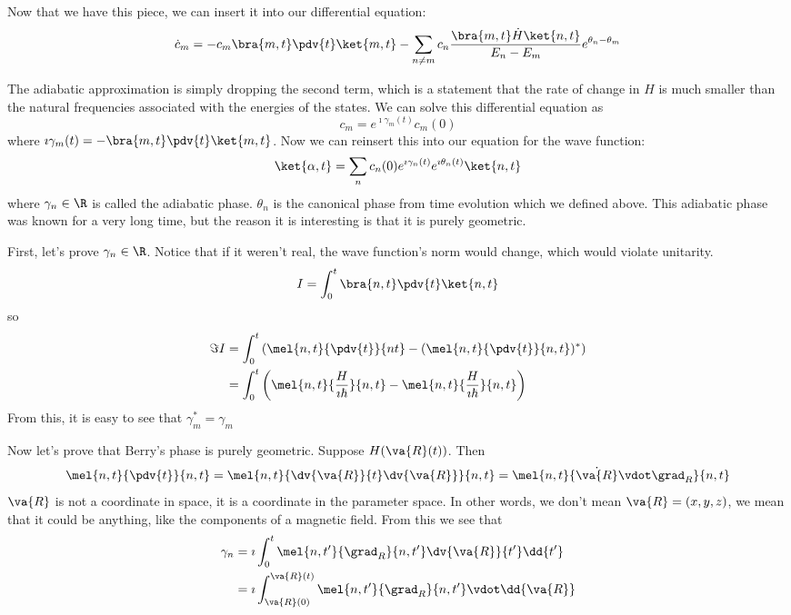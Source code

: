 \documentclass[a4paper,twoside,master.tex]{subfiles}
\begin{document}
Now that we have this piece, we can insert it into our differential equation:
\begin{equation}
    \dot{c}_m = -c_m \bra{m,t} \pdv{t}\ket{m,t} - \sum_{n \neq m} c_n \frac{\bra{m,t} \dot{H}\ket{n,t}}{E_n - E_m} e^{\theta_n - \theta_m} 
\end{equation}

The adiabatic approximation is simply dropping the second term, which is a statement that the rate of change in $ H $ is much smaller than the natural frequencies associated with the energies of the states. We can solve this differential equation as
\begin{equation}
    c_m = e^{\imath \gamma_m(t)} c_m(0)
\end{equation}
where $ \imath \gamma_m(t) = -\bra{m, t} \pdv{t}\ket{m, t} $. Now we can reinsert this into our equation for the wave function:
\begin{equation}
    \ket{\alpha, t} = \sum_n c_n(0) e^{\imath \gamma_n(t)} e^{\imath \theta_n(t)}\ket{n, t}
\end{equation}
where $ \gamma_n \in \R $ is called the adiabatic phase. $ \theta_n $ is the canonical phase from time evolution which we defined above. This adiabatic phase was known for a very long time, but the reason it is interesting is that it is purely geometric.

First, let's prove $ \gamma_n \in \R $. Notice that if it weren't real, the wave function's norm would change, which would violate unitarity.
\begin{equation}
    I = \int_0^t\bra{n,t} \pdv{t}\ket{n,t}
\end{equation}
so
\begin{align}
    \Im I &= \int_0^t \left( \mel{n,t}{\pdv{t}}{nt} - (\mel{n,t}{\pdv{t}}{n,t})^* \right) \\
    &= \int_0^t \left( \mel{n,t}{\frac{H}{\imath \hbar}}{n,t} - \mel{n,t}{\frac{H}{\imath \hbar}}{n,t} \right)
\end{align}
From this, it is easy to see that $ \gamma_m^* = \gamma_m $


Now let's prove that Berry's phase is purely geometric. Suppose $ H(\va{R}(t)) $. Then
\begin{equation}
    \mel{n,t}{\pdv{t}}{n,t} = \mel{n,t}{\dv{\va{R}}{t} \dv{\va{R}}}{n,t} = \mel{n,t}{\dot{\va{R}} \vdot \grad_R}{n,t}
\end{equation}
$ \va{R} $ is not a coordinate in space, it is a coordinate in the parameter space. In other words, we don't mean $ \va{R} = (x, y, z) $, we mean that it could be anything, like the components of a magnetic field. From this we see that
\begin{align}
    \gamma_n &= \imath \int_0^t \mel{n,t'}{\grad_R}{n,t'} \dv{\va{R}}{t'} \dd{t'}\\
    &= \imath \int_{\va{R}(0)}^{\va{R}(t)} \mel{n,t'}{\grad_R}{n,t'} \vdot \dd{\va{R}}
\end{align}
\end{document}
